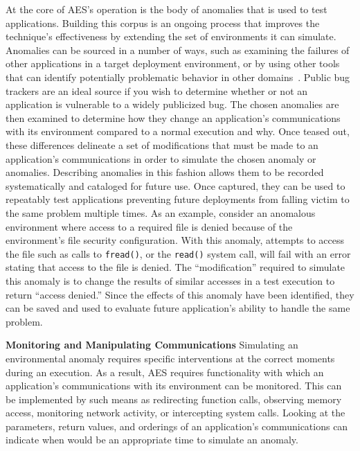 At the core of AES's operation is the body of anomalies that
is used to test applications.
Building this corpus is an ongoing process that improves the technique's
effectiveness by extending the set of environments it can simulate.
Anomalies can be sourced
in a number of ways,
such as
examining the failures of other applications
in a target deployment environment,
or by using other tools that can identify
potentially problematic behavior in other domains~\cite{Zhuang_NSDI_2014,
rasley2015detecting}.
Public bug trackers are an ideal source
if you wish to determine
whether or not an application
is vulnerable to a widely publicized bug.
The chosen anomalies are then examined
to determine how they change an application's communications
with its environment
compared to a normal execution and why.
Once teased out,
these differences delineate
a set of modifications
that must be made to an application's communications
in order to simulate the chosen anomaly or anomalies.
Describing anomalies in this fashion
allows them to be recorded systematically and cataloged for future use.
Once captured, they can be used to repeatably test applications preventing
future deployments from falling victim to the same problem multiple
times.
As an example,
consider an anomalous environment
where access to a required file is denied because of
the environment's file security configuration.
With this anomaly,
attempts to access the file
such as calls to {\tt fread()},
or the {\tt read()} system call,
will fail with an error stating that access to the file is denied.
The ``modification'' required to simulate this anomaly
is to change the results of similar accesses
in a test execution
to return ``access denied.''
Since the effects of this anomaly have been identified, they can be saved
and used to evaluate future application's ability to handle the same
problem.


\textbf{Monitoring and Manipulating Communications}
Simulating an environmental anomaly requires specific interventions at the
correct moments during an execution.  As a result, AES requires
functionality with
which an application's communications with its environment can be
monitored.
This can be implemented
by such means as
redirecting function calls,
observing memory access,
monitoring network activity,
or intercepting system calls.
Looking at the parameters,
return values,
and orderings
of an application's communications
can indicate
when would be an appropriate time to simulate an anomaly.

